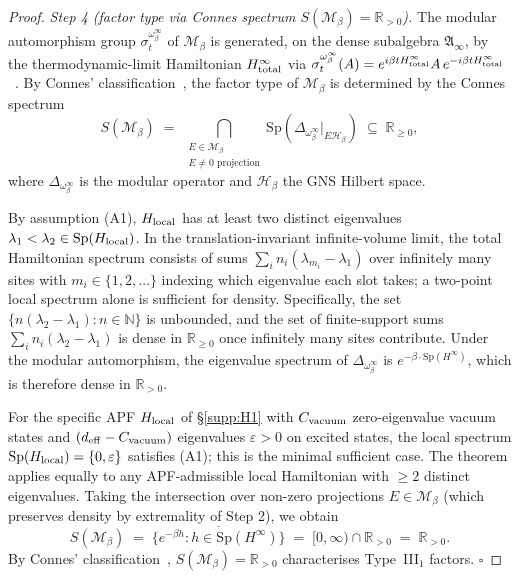 \documentclass[11pt]{article}
\theoremstyle{plain}
\theoremstyle{definition}
\theoremstyle{remark}
\begin{document}
\begin{proof}
\medskip

\emph{Step 4 (factor type via Connes spectrum $S(\mathcal{M}_\beta) = \mathbb{R}_{>0}$).}  The modular automorphism group $\sigma_t^{\omega_\beta^\infty}$ of $\mathcal{M}_\beta$ is generated, on the dense subalgebra $\mathfrak{A}_\infty$, by the thermodynamic-limit Hamiltonian $H^\infty_{\rm total}$ via $\sigma_t^{\omega_\beta^\infty}(A) = e^{i\beta t H^\infty_{\rm total}} A \, e^{-i\beta t H^\infty_{\rm total}}$~\cite[Theorem~5.3.10]{BratelliRobinson}.  By Connes' classification~\cite{Connes1973}, the factor type of $\mathcal{M}_\beta$ is determined by the Connes spectrum
\[
  S(\mathcal{M}_\beta) \;=\; \bigcap_{\substack{E \in \mathcal{M}_\beta \\ E \neq 0 \text{ projection}}} \mathrm{Sp}\!\left( \Delta_{\omega_\beta^\infty}|_{E\mathcal{H}_\beta} \right) \;\subseteq\; \mathbb{R}_{\geq 0},
\]
where $\Delta_{\omega_\beta^\infty}$ is the modular operator and $\mathcal{H}_\beta$ the GNS Hilbert space.

By assumption (A1), $H_{\rm local}$ has at least two distinct eigenvalues $\lambda_1 < \lambda_2 \in \mathrm{Sp}(H_{\rm local})$.  In the translation-invariant infinite-volume limit, the total Hamiltonian spectrum consists of sums $\sum_i n_i (\lambda_{m_i} - \lambda_1)$ over infinitely many sites with $m_i \in \{1, 2, \ldots\}$ indexing which eigenvalue each slot takes; a two-point local spectrum alone is sufficient for density.  Specifically, the set $\{ n (\lambda_2 - \lambda_1) : n \in \mathbb{N} \}$ is unbounded, and the set of finite-support sums $\sum_i n_i (\lambda_2 - \lambda_1)$ is dense in $\mathbb{R}_{\geq 0}$ once infinitely many sites contribute.  Under the modular automorphism, the eigenvalue spectrum of $\Delta_{\omega_\beta^\infty}$ is $e^{-\beta \cdot \mathrm{Sp}(H^\infty)}$, which is therefore dense in $\mathbb{R}_{>0}$.

For the specific APF $H_{\rm local}$ of \S\ref{supp:H1} with $C_{\rm vacuum}$ zero-eigenvalue vacuum states and $(d_{\rm eff} - C_{\rm vacuum})$ eigenvalues $\varepsilon > 0$ on excited states, the local spectrum $\mathrm{Sp}(H_{\rm local}) = \{0, \varepsilon\}$ satisfies (A1); this is the minimal sufficient case.  The theorem applies equally to any APF-admissible local Hamiltonian with $\geq 2$ distinct eigenvalues.  Taking the intersection over non-zero projections $E \in \mathcal{M}_\beta$ (which preserves density by extremality of Step 2), we obtain
\[
  S(\mathcal{M}_\beta) \;=\; \overline{\{ e^{-\beta h} : h \in \mathrm{Sp}(H^\infty) \}} \;=\; [0, \infty) \cap \mathbb{R}_{>0} \;=\; \mathbb{R}_{>0}.
\]
By Connes' classification~\cite{Connes1973}, $S(\mathcal{M}_\beta) = \mathbb{R}_{>0}$ characterises Type~III$_1$ factors.  $\square$
\end{proof}
\end{document}
